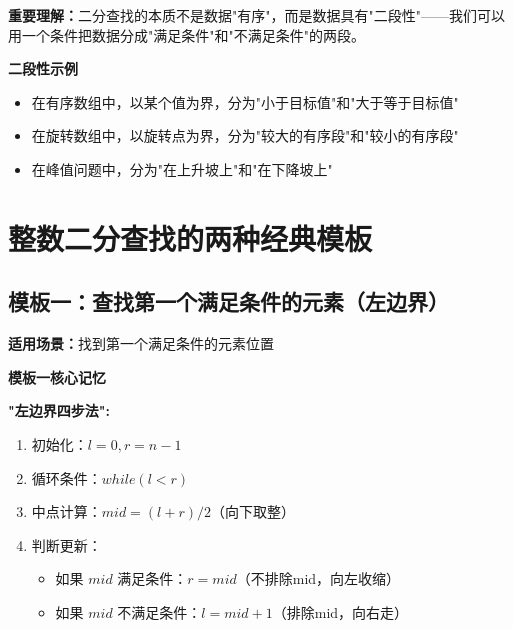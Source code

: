\documentclass[12pt,a4paper]{article}
\begin{document}
	\textbf{重要理解：}二分查找的本质不是数据"有序"，而是数据具有"二段性"——我们可以用一个条件把数据分成"满足条件"和"不满足条件"的两段。
	
	\begin{yellowbox}
		\textbf{二段性示例}
		
		\begin{itemize}
			\item 在有序数组中，以某个值为界，分为"小于目标值"和"大于等于目标值"
			\item 在旋转数组中，以旋转点为界，分为"较大的有序段"和"较小的有序段"
			\item 在峰值问题中，分为"在上升坡上"和"在下降坡上"
		\end{itemize}
	\end{yellowbox}
	
	\section{整数二分查找的两种经典模板}
	
	\subsection{模板一：查找第一个满足条件的元素（左边界）}
	
	\textbf{适用场景：}找到第一个满足条件的元素位置
	
	\begin{greenbox}
		\textbf{模板一核心记忆}
		
		\textbf{"左边界四步法":}
		\begin{enumerate}
			\item 初始化：$l = 0, r = n - 1$
			\item 循环条件：$while(l < r)$
			\item 中点计算：$mid = (l + r) / 2$（向下取整）
			\item 判断更新：
			\begin{itemize}
				\item 如果 $mid$ 满足条件：$r = mid$（不排除mid，向左收缩）
				\item 如果 $mid$ 不满足条件：$l = mid + 1$（排除mid，向右走）
			\end{itemize}
		\end{enumerate}
	\end{greenbox}
	
\end{document}
